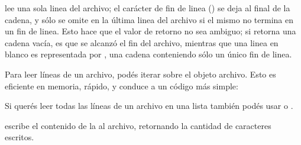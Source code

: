 \documentclass[a5paper,10pt,spanish]{sphinxmanual}
\begin{document}
\sphinxAtStartPar
{} lee una sola linea del archivo; el carácter de fin de linea () se deja al final de la cadena, y sólo se omite en la última linea del archivo si el mismo no termina en un fin de linea.  Esto hace que el valor de retorno no sea ambiguo; si  retorna una cadena vacía, es que se alcanzó el fin del archivo, mientras que una linea en blanco es representada por , una cadena conteniendo sólo un único fin de linea.

\begin{sphinxVerbatim}[commandchars=\\\{\}]
\end{sphinxVerbatim}

\sphinxAtStartPar
Para leer líneas de un archivo, podés iterar sobre el objeto archivo. Esto es eficiente en memoria, rápido, y conduce a un código más simple:

\begin{sphinxVerbatim}[commandchars=\\\{\}]
   
     
\end{sphinxVerbatim}

\sphinxAtStartPar
Si querés leer todas las líneas de un archivo en una lista también podés usar  o .

\sphinxAtStartPar
{} escribe el contenido de la  al archivo, retornando la cantidad de caracteres escritos.

\begin{sphinxVerbatim}[commandchars=\\\{\}]
\end{sphinxVerbatim}
\end{document}
